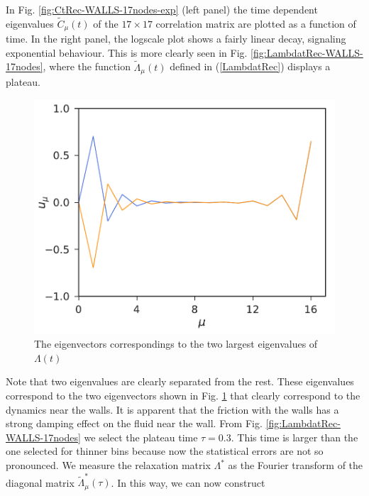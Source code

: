 \documentclass[b5paper,openright,10pt]{book}
\begin{document}
In  Fig.
\ref{fig:CtRec-WALLS-17nodes-exp}   (left   panel)   the   time   dependent   eigenvalues
$\tilde{C}_{\mu}(t)$  of  the  $17\times 17$  correlation  matrix  are
plotted as a function of time.  In the right panel, the logscale plot
shows a fairly linear decay, signaling exponential behaviour.  This is
more  clearly   seen  in   Fig. \ref{fig:LambdatRec-WALLS-17nodes},  where   the  function
$\tilde{\Lambda}_\mu(t)$  defined  in  (\ref{LambdatRec})  displays  a
plateau.  
\begin{figure}[h!]
  \centering
  \includegraphics[scale=0.41]{Eigenvectors-WALLS-17nodes}
    \caption[The igenvectors correspondings to the two largest eigenvalues of $\Lambda(t)$ for a confined fluid - Thick bins]{
        The eigenvectors correspondings to the two largest eigenvalues of $\Lambda(t)$}
\label{Fig.WallEigenvectors2}
\end{figure}
Note that  two eigenvalues are  clearly separated
from the rest.   These eigenvalues correspond to  the two eigenvectors
shown in  Fig. \ref{Fig.WallEigenvectors2} that clearly  correspond to
the  dynamics  near  the   walls.  
It is apparent  that the friction with the walls  has a strong damping
effect on  the fluid  near the wall.   From Fig. \ref{fig:LambdatRec-WALLS-17nodes} we
select the plateau  time $\tau=0.3$. This time is larger  than the one
selected for thinner bins because now the statistical errors are not so
pronounced.  We  measure  the  relaxation matrix  $\Lambda^*$  as  the
Fourier       transform       of       the       diagonal       matrix
$\tilde{\Lambda}_{\mu}^*(\tau)$.  In  this way,  we can  now construct
\end{document}
